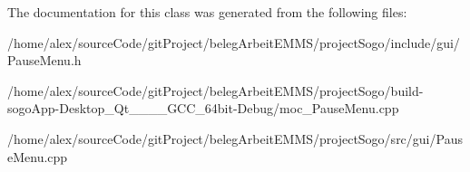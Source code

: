 The documentation for this class was generated from the following files\-:\begin{DoxyCompactItemize}
\item 
/home/alex/source\-Code/git\-Project/beleg\-Arbeit\-E\-M\-M\-S/project\-Sogo/include/gui/Pause\-Menu.\-h\item 
/home/alex/source\-Code/git\-Project/beleg\-Arbeit\-E\-M\-M\-S/project\-Sogo/build-\/sogo\-App-\/\-Desktop\-\_\-\-Qt\-\_\-\_\-\_\-\_\-\-G\-C\-C\-\_\-64bit-\/\-Debug/moc\-\_\-\-Pause\-Menu.\-cpp\item 
/home/alex/source\-Code/git\-Project/beleg\-Arbeit\-E\-M\-M\-S/project\-Sogo/src/gui/Pause\-Menu.\-cpp\end{DoxyCompactItemize}
